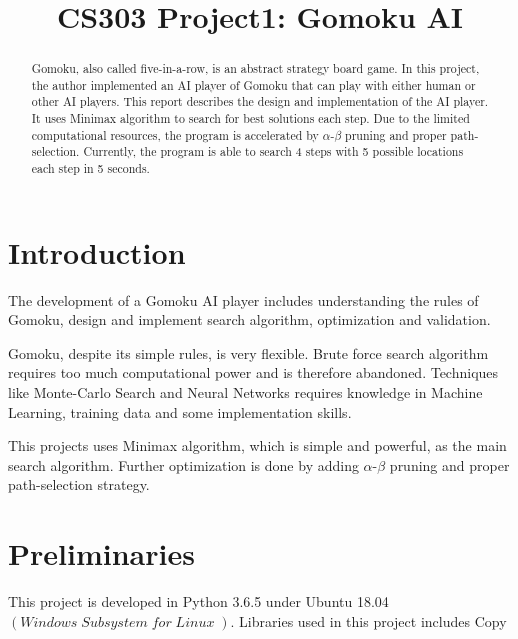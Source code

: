 \documentclass[conference]{IEEEtran}
\begin{document}
  
  \title{CS303 Project1: Gomoku AI}
  
  \author{
  }
  
  \maketitle
  
  \begin{abstract}
  Gomoku, also called five-in-a-row, is an abstract strategy board game. In this project, the author implemented an AI player of Gomoku that can play with either human or other AI players. This report describes the design and implementation of the AI player. It uses Minimax algorithm to search for best solutions each step. Due to the limited computational resources, the program is accelerated by $\alpha$-$\beta$ pruning and proper path-selection. Currently, the program is able to search 4 steps with 5 possible locations each step in 5 seconds. 
  \end{abstract}
  \IEEEpeerreviewmaketitle
  
  \section{Introduction}
  The development of a Gomoku AI player includes understanding the rules of Gomoku, design and implement search algorithm, optimization and validation.

  Gomoku, despite its simple rules, is very flexible. Brute force search algorithm requires too much computational power and is therefore abandoned. Techniques like Monte-Carlo Search and Neural Networks requires knowledge in Machine Learning, training data and some implementation skills.
  
  This projects uses Minimax algorithm, which is simple and powerful, as the main search algorithm. Further optimization is done by adding $\alpha$-$\beta$ pruning and proper path-selection strategy.
  \section{Preliminaries}
  This project is developed in Python 3.6.5 under Ubuntu 18.04 $\left(Windows\; Subsystem \; for\; Linux\; \right)$. Libraries used in this project includes Copy
\end{document}
